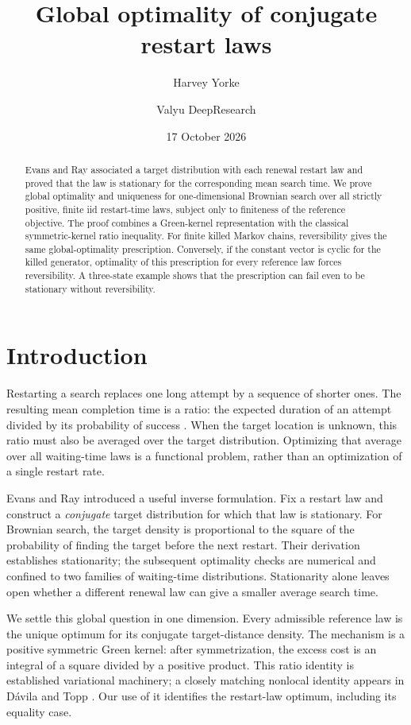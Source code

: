 \documentclass[11pt]{amsart}
\title[Global optimality of conjugate restart laws]{Global optimality of conjugate restart laws}
\author{Harvey Yorke}
\author{Valyu DeepResearch}
\date{17 October 2026}
\theoremstyle{definition}
\theoremstyle{remark}
\begin{document}
\begin{abstract}
Evans and Ray associated a target distribution with each renewal restart law and proved that the law is stationary for the corresponding mean search time. We prove global optimality and uniqueness for one-dimensional Brownian search over all strictly positive, finite iid restart-time laws, subject only to finiteness of the reference objective. The proof combines a Green-kernel representation with the classical symmetric-kernel ratio inequality. For finite killed Markov chains, reversibility gives the same global-optimality prescription. Conversely, if the constant vector is cyclic for the killed generator, optimality of this prescription for every reference law forces reversibility. A three-state example shows that the prescription can fail even to be stationary without reversibility.
\end{abstract}
\maketitle

\section{Introduction}

Restarting a search replaces one long attempt by a sequence of shorter ones. The resulting mean completion time is a ratio: the expected duration of an attempt divided by its probability of success \cite{PalReuveni2017}. When the target location is unknown, this ratio must also be averaged over the target distribution. Optimizing that average over all waiting-time laws is a functional problem, rather than an optimization of a single restart rate.

Evans and Ray \cite{EvansRay2025} introduced a useful inverse formulation. Fix a restart law and construct a \emph{conjugate} target distribution for which that law is stationary. For Brownian search, the target density is proportional to the square of the probability of finding the target before the next restart. Their derivation establishes stationarity; the subsequent optimality checks are numerical and confined to two families of waiting-time distributions. Stationarity alone leaves open whether a different renewal law can give a smaller average search time.

We settle this global question in one dimension. Every admissible reference law is the unique optimum for its conjugate target-distance density. The mechanism is a positive symmetric Green kernel: after symmetrization, the excess cost is an integral of a square divided by a positive product. This ratio identity is established variational machinery; a closely matching nonlocal identity appears in D\'avila and Topp \cite[Lemma~4.3, equation~(4.3)]{DavilaTopp2023}. Our use of it identifies the restart-law optimum, including its equality case.
\end{document}
